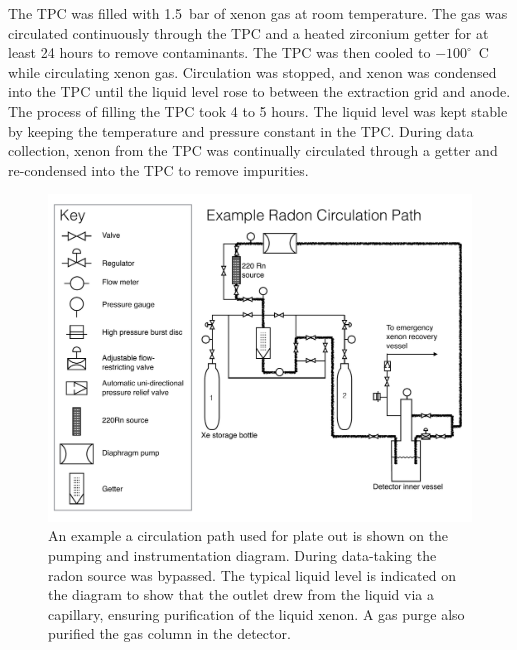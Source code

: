 The \ac{TPC} was filled with 1.5~bar of xenon gas at room temperature. The gas was circulated continuously through the \ac{TPC} and a heated zirconium getter for at least 24 hours to remove contaminants. The \ac{TPC} was then cooled to $-100^{\circ}$~C while circulating xenon gas. Circulation was stopped, and xenon was condensed into the \ac{TPC} until the liquid level rose to between the extraction grid and anode. The process of filling the \ac{TPC} took 4 to 5 hours. The liquid level was kept stable by keeping the temperature and pressure constant in the \ac{TPC}. During data collection, xenon from the \ac{TPC} was continually circulated through a getter and re-condensed into the \ac{TPC} to remove impurities. %

\begin{figure}[ht]
    \centering
        \includegraphics[width=\textwidth]{figures/radon/Rncircpath.pdf}
    \caption{An example a circulation path used for plate out is shown on the pumping and instrumentation diagram. During data-taking the radon source was bypassed. The typical liquid level is indicated on the diagram to show that the outlet drew from the liquid via a capillary, ensuring purification of the liquid xenon. A gas purge also purified the gas column in the detector.}
    \label{fig:p_and_id}
\end{figure}

